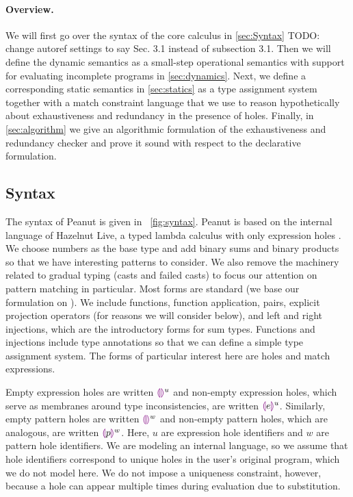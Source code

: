 \documentclass[runningheads,envcountsame,a4paper]{llncs}
\newcommand{\todo}[1]{{\color{red} TODO: #1}}
\begin{document}
\paragraph{Overview.}
We will first go over the syntax of the core calculus in \autoref{sec:Syntax}\todo{change autoref settings to say Sec. 3.1 instead of subsection 3.1}. Then we will define the dynamic semantics as a small-step operational semantics with support for evaluating incomplete programs in \autoref{sec:dynamics}. Next, we define a corresponding static
semantics in \autoref{sec:statics} as a type assignment system together with a match constraint language
that we use to reason hypothetically about exhaustiveness and redundancy in the presence of
holes. Finally, in \autoref{sec:algorithm} we give an algorithmic formulation of the exhaustiveness and redundancy checker and prove it sound with respect to the
declarative formulation.

\subsection{Syntax}
\label{sec:Syntax}
The syntax of Peanut is given in \figurename~\ref{fig:syntax}. 
Peanut is based on the internal language of Hazelnut Live, a typed lambda calculus with only expression holes \cite{DBLP:journals/pacmpl/OmarVCH19}.
We choose numbers as the base type and add binary sums and binary products so that we have interesting
patterns to consider. We also remove the machinery related to gradual typing (casts and failed casts) to focus our attention on pattern matching in particular. Most forms are standard (we base our formulation on \cite{Harper2012}). We include functions, function application, pairs, explicit projection operators (for reasons we will consider below), and left and right injections, which are the introductory forms for sum types. Functions and injections include type annotations so that we can define a simple type assignment system. The forms of particular interest here are holes and match expressions.

Empty expression holes are written $\textcolor{violet}{\llparenthesis}\textcolor{violet}{\rrparenthesis}^{u}$ and non-empty expression holes, which serve as membranes around type inconsistencies, are written $\textcolor{violet}{\llparenthesis} e\textcolor{violet}{\rrparenthesis}^{u}$. Similarly, empty pattern holes are written $\textcolor{violet}{\llparenthesis}\textcolor{violet}{\rrparenthesis}^{w}$ and non-empty pattern holes, which are analogous, are written $\textcolor{violet}{\llparenthesis} p\textcolor{violet}{\rrparenthesis}^{w}$. Here, $u$ are expression hole identifiers and $w$ are pattern hole identifiers.
We are modeling an internal language, so we assume that hole identifiers 
correspond to unique holes in the user's original program, which we do not model here. We do not impose a uniqueness constraint, however, because a hole can 
appear multiple times during evaluation due to substitution.
\end{document}
